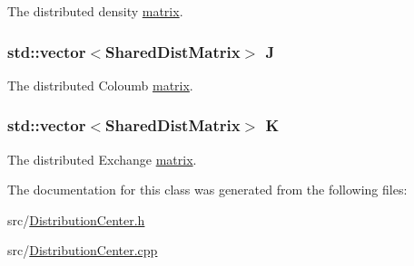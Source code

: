 The distributed density \hyperlink{classJKBuilder_1_1matrix}{matrix}. \hypertarget{classJKBuilder_1_1DistributionCenter_a83e7fc1320b7071187dce35322e659b2}{
\subsubsection[{J}]{\setlength{\rightskip}{0pt plus 5cm}std::vector$<${\bf SharedDistMatrix}$>$ {\bf J}}}
\label{classJKBuilder_1_1DistributionCenter_a83e7fc1320b7071187dce35322e659b2}


The distributed Coloumb \hyperlink{classJKBuilder_1_1matrix}{matrix}. \hypertarget{classJKBuilder_1_1DistributionCenter_a36d7716ac07910f43805622922c1fb93}{
\subsubsection[{K}]{\setlength{\rightskip}{0pt plus 5cm}std::vector$<${\bf SharedDistMatrix}$>$ {\bf K}}}
\label{classJKBuilder_1_1DistributionCenter_a36d7716ac07910f43805622922c1fb93}


The distributed Exchange \hyperlink{classJKBuilder_1_1matrix}{matrix}. 

The documentation for this class was generated from the following files:\begin{DoxyCompactItemize}
\item 
src/\hyperlink{DistributionCenter_8h}{DistributionCenter.h}\item 
src/\hyperlink{DistributionCenter_8cpp}{DistributionCenter.cpp}\end{DoxyCompactItemize}
